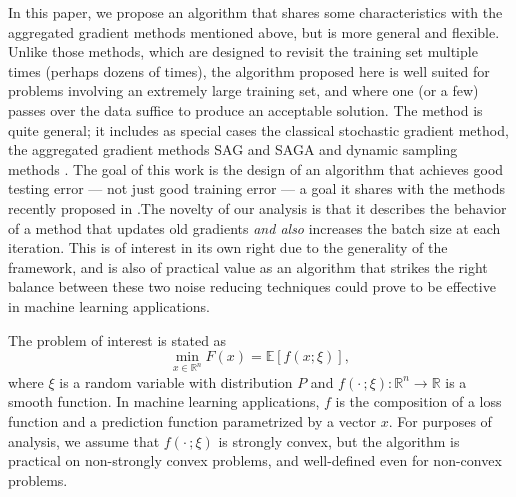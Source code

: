 \documentclass[11pt]{article}
\begin{document}
In this paper, we propose an algorithm that shares some characteristics with the aggregated gradient methods mentioned above, but is more general and flexible. Unlike those methods, which are designed to revisit the training set multiple times (perhaps dozens of times), the algorithm proposed here is well suited for problems involving an extremely large training set, and where one (or a few) passes over the data suffice to produce an acceptable solution. The method is quite general; it includes as special cases  the classical stochastic gradient method, the aggregated gradient methods SAG \cite{NIPS2014_5258} and SAGA \cite{NIPS2014_5258} and  dynamic sampling methods \cite{dss,FS2011,2014pasglyetal}. The goal  of this work is the design of an algorithm that achieves good testing error --- not just good training error --- a goal it shares with the methods recently proposed in \cite{frostig2014competing,babanezhad2015stop}.The  novelty of our analysis is that it describes the behavior of a method that  updates old gradients \emph{and also}  increases the batch size at each iteration. This is of interest in its own right due to the generality of the framework, and is also of practical value as an algorithm that strikes the right balance between these two noise reducing techniques could prove to be  effective in machine learning applications.


The problem of interest is stated as
\begin{equation}  \label{risk}
	\min_{x \in \mathbb{R}^n} F(x) = \mathbb{E}[ f(x;\xi)] ,
\end{equation}
where $\xi$ is a random variable with distribution $P$ and $f(\cdot\,; \xi): \mathbb{R}^n \rightarrow \mathbb{R}$  is a smooth function. In machine learning applications, $f$ is the composition of a  loss function and a prediction function parametrized by a vector $x$. 
For purposes of analysis, we assume that $f(\cdot\,; \xi)$ is strongly convex, but the algorithm is practical on non-strongly convex problems, and well-defined even for non-convex problems. 
\end{document}
